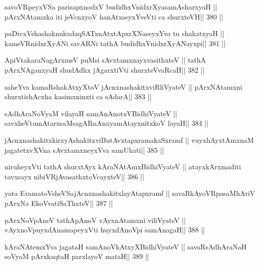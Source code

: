 \begin{shl}
savoVR\s peyxVSa parisapxnodxV budidhxVnidxrXyasamAsharxyaH ||
pArxNAtamxka iti jeVcnxyoV hanAtxseyxYveVti ca shurxteVH\hfill || 380 ||
\end{shl}

\begin{shl}
paDivxVshashaknukxdaqSATxnAtxtApxrXNaseyxYva tu shakatxyaH ||
kameVRnidxrXyANi savARNi tathA budidhxVnidxrXyANayxpi\hfill || 381 ||
\end{shl}

\begin{shl}
ApiVtakaraNagArxmeV puMsi sAvxtamxnayxvasithxteV ||
tathA pArxNAganxyaH shudAdhx jAgarxtiVti shurxteVvaRcaH\hfill || 382 ||
\end{shl}

\begin{shl}
saheYva kamaRshakAtxyX\s toV jAcnxnashakitxviRliVyateV ||
pArxNAtamxni shurxtishAcx\s\s ha kasimxninxti ca sAdarA\hfill || 383 ||
\end{shl}

\begin{shl}
sAdhAraNoV\s yaM vilayaH samAnAnotxV\s BidhiVyateV ||
savxheVtumAtarxsaMsagARnAnxyamAtayxnitxkoV layaH\hfill || 384 ||
\end{shl}

\begin{shl}
jAcnxnashakitxkirxyAshakitxviButAvxtapxramakaSxramf ||
vuyxhAyx\s\s tAmxnaM jagatetxvXVna sAvxtamxneyxVva samUhati\hfill || 385 ||
\end{shl}

\begin{shl}
niruheyxVti tathA shurxtAyx kAraNAtAmx\s BidhiVyateV ||
atayxkArxmaditi tavxsayx nibiVRjAvasathxtoVcayxteV\hfill || 386 ||
\end{shl}

\begin{shl}
yata EvamatoV\s sheVSajAcnxnashakitxlayAtapxramf ||
savaRkAyoVRpasaMhAriV pArxNa EkoV\s vatiSaThxteV\hfill || 387 ||
\end{shl}

\begin{shl}
pArxNoV\s pAneV tathA\s pAnoV vAyxnAtamxni viliVyateV ||
vAyxnoV\s puyxdAnamapeyxVti huyxdAnoV\s pi samAnagaH\hfill || 388 ||
\end{shl}

\begin{shl}
kAraNAtemxYva jagataH samAnoVkAtxyX\s BidhiVyateV ||
savaRsAdhAraNaH soV\s yaM pArxkaqtaH parxlayoV mataH\hfill || 389 ||
\end{shl}

